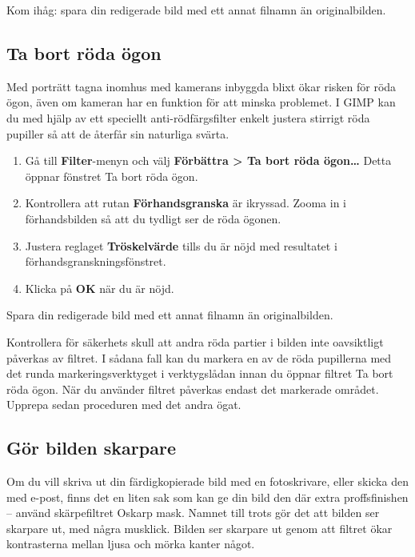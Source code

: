 \documentclass[a4paper,final]{memoir} %
\begin{document}
Kom ihåg: spara din redigerade bild med ett annat filnamn än originalbilden.

\subsection{Ta bort röda ögon}


Med porträtt tagna inomhus med kamerans inbyggda blixt ökar risken för röda ögon, även om kameran har en funktion för att minska problemet. I GIMP kan du med hjälp av ett speciellt anti-rödfärgsfilter enkelt justera stirrigt röda pupiller så att de återfår sin naturliga svärta.	

\begin{enumerate}

\item Gå till \textbf{Filter}-menyn och välj \textbf{Förbättra \textgreater{} Ta bort röda ögon\ldots{}} Detta öppnar fönstret Ta bort röda ögon. 

\item Kontrollera att rutan \textbf{Förhandsgranska} är ikryssad. Zooma in i förhandsbilden så att du tydligt ser de röda ögonen. 

\item Justera reglaget \textbf{Tröskelvärde} tills du är nöjd med resultatet i förhandsgranskningsfönstret. 

\item Klicka på \textbf{OK} när du är nöjd. 

\end{enumerate}

Spara din redigerade bild med ett annat filnamn än originalbilden.

Kontrollera för säkerhets skull att andra röda partier i bilden inte oavsiktligt påverkas av filtret. I sådana fall kan du markera en av de röda pupillerna med det runda markeringsverktyget i verktygslådan innan du öppnar filtret Ta bort röda ögon. När du använder filtret påverkas endast det markerade området. Upprepa sedan proceduren med det andra ögat.

\subsection{Gör bilden skarpare}


Om du vill skriva ut din färdigkopierade bild med en fotoskrivare, eller skicka den med e-post, finns det en liten sak som kan ge din bild den där extra proffsfinishen -- använd skärpefiltret Oskarp mask. Namnet till trots gör det att bilden ser skarpare ut, med några musklick. Bilden ser skarpare ut genom att filtret ökar kontrasterna mellan ljusa och mörka kanter något.
\end{document}
